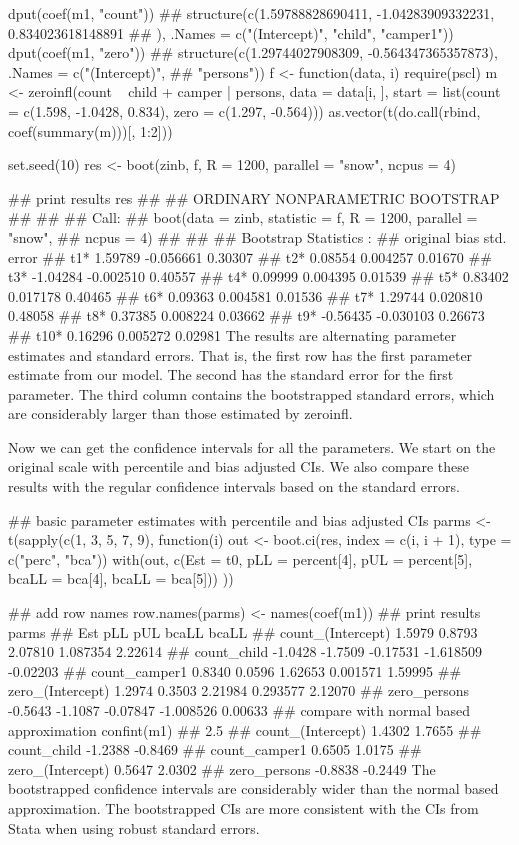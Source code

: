\documentclass[MASTER.tex]{subfiles}
\begin{document}
\begin{frame}[fragile]
dput(coef(m1, "count"))
## structure(c(1.59788828690411, -1.04283909332231, 0.834023618148891
## ), .Names = c("(Intercept)", "child", "camper1"))
dput(coef(m1, "zero"))
## structure(c(1.29744027908309, -0.564347365357873), .Names = c("(Intercept)", 
## "persons"))
f <- function(data, i) {
  require(pscl)
  m <- zeroinfl(count ~ child + camper | persons, data = data[i, ],
    start = list(count = c(1.598, -1.0428, 0.834), zero = c(1.297, -0.564)))
  as.vector(t(do.call(rbind, coef(summary(m)))[, 1:2]))
}

set.seed(10)
res <- boot(zinb, f, R = 1200, parallel = "snow", ncpus = 4)

## print results
res
## 
## ORDINARY NONPARAMETRIC BOOTSTRAP
## 
## 
## Call:
## boot(data = zinb, statistic = f, R = 1200, parallel = "snow", 
##     ncpus = 4)
## 
## 
## Bootstrap Statistics :
##      original    bias    std. error
## t1*   1.59789 -0.056661     0.30307
## t2*   0.08554  0.004257     0.01670
## t3*  -1.04284 -0.002510     0.40557
## t4*   0.09999  0.004395     0.01539
## t5*   0.83402  0.017178     0.40465
## t6*   0.09363  0.004581     0.01536
## t7*   1.29744  0.020810     0.48058
## t8*   0.37385  0.008224     0.03662
## t9*  -0.56435 -0.030103     0.26673
## t10*  0.16296  0.005272     0.02981
The results are alternating parameter estimates and standard errors. That is, the first row has the first parameter estimate from our model. The second has the standard error for the first parameter. The third column contains the bootstrapped standard errors, which are considerably larger than those estimated by zeroinfl.

Now we can get the confidence intervals for all the parameters. We start on the original scale with percentile and bias adjusted CIs. We also compare these results with the regular confidence intervals based on the standard errors.

## basic parameter estimates with percentile and bias adjusted CIs
parms <- t(sapply(c(1, 3, 5, 7, 9), function(i) {
  out <- boot.ci(res, index = c(i, i + 1), type = c("perc", "bca"))
  with(out, c(Est = t0, pLL = percent[4], pUL = percent[5],
     bcaLL = bca[4], bcaLL = bca[5]))
}))

## add row names
row.names(parms) <- names(coef(m1))
## print results
parms
##                       Est     pLL      pUL     bcaLL    bcaLL
## count_(Intercept)  1.5979  0.8793  2.07810  1.087354  2.22614
## count_child       -1.0428 -1.7509 -0.17531 -1.618509 -0.02203
## count_camper1      0.8340  0.0596  1.62653  0.001571  1.59995
## zero_(Intercept)   1.2974  0.3503  2.21984  0.293577  2.12070
## zero_persons      -0.5643 -1.1087 -0.07847 -1.008526  0.00633
## compare with normal based approximation
confint(m1)
##                     2.5 %
## count_(Intercept)  1.4302  1.7655
## count_child       -1.2388 -0.8469
## count_camper1      0.6505  1.0175
## zero_(Intercept)   0.5647  2.0302
## zero_persons      -0.8838 -0.2449
The bootstrapped confidence intervals are considerably wider than the normal based approximation. The bootstrapped CIs are more consistent with the CIs from Stata when using robust standard errors.


\end{frame}
\end{document}
